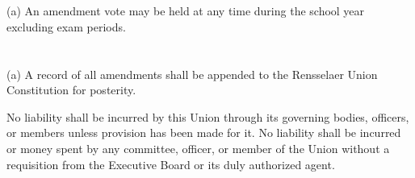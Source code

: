 \documentclass[12pt]{constitution}
\begin{document}
\section{}
(a) An amendment vote may be held at any time during the school year excluding exam periods.

\section{}
(a) A record of all amendments shall be appended to the Rensselaer Union Constitution for
posterity.


No liability shall be incurred by this Union through its governing bodies, officers, or members unless
provision has been made for it. No liability shall be incurred or money spent by any committee, officer,
or member of the Union without a requisition from the Executive Board or its duly authorized agent. 
\end{document}
